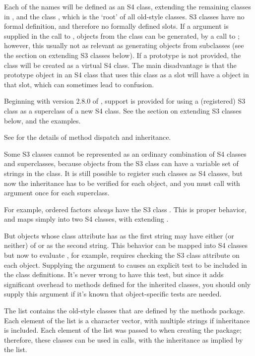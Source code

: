 \begin{Details}\relax
Each of the names will be defined as an S4 class, extending the
remaining classes in , and the class ,
which is the `root' of all old-style classes. S3 classes have
no formal definition, and therefore no formally defined slots. If a
 argument is supplied in the call to
, objects from the class can be generated, by a
call to ; however, this usually not as relevant as
generating objects from subclasses (see the section on extending S3
classes below).   If  a prototype is not provided,
the class will be created as a virtual S4 class.
The main disadvantage is that the prototype object in an S4 class that
uses this class as a slot will have a  object in that slot,
which can sometimes lead to confusion.

Beginning with version 2.8.0 of \R{}, support is provided for using a
(registered) S3 class as a superclass of a new S4 class.  See the
section on extending S3 classes below, and the examples.

See  for the details of method dispatch and
inheritance.

Some S3 classes cannot be represented as an ordinary combination of S4
classes and superclasses, because objects from the S3 class can have a
variable set of strings in the class. It is still possible to register
such classes as S4 classes, but now the inheritance has to be verified
for each object, and you must call  with argument
 once for each superclass.

For example, ordered factors \emph{always} have the S3
class .  This is proper behavior, and
maps simply into two S4 classes, with  extending
.

But objects whose class attribute has  as the first
string may have either (or neither) of  or
 as the second string.  This behavior can be mapped
into S4 classes but now to evaluate , for
example, requires checking the S3 class attribute on each object.
Supplying the  argument to  causes
an explicit test to be included in the class definitions.  It's
never wrong to have this test, but since it adds significant
overhead to methods defined for the inherited classes, you should
only supply this argument if it's known that object-specific tests
are needed.

The list  contains the old-style classes that
are defined by the methods package.  Each element of the list is a
character vector, with multiple strings if inheritance is included.
Each element of the list was passed to  when
creating the  package; therefore, these classes can be used
in  calls, with the inheritance as implied by
the list.
\end{Details}
